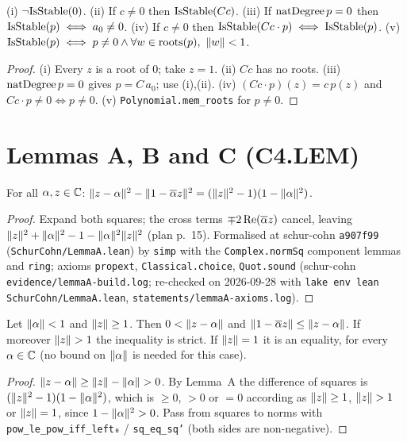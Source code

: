 \begin{lemma}\label{lem:stable-basic}
(i) $\neg\mathrm{IsStable}(0)$. (ii) If $c\ne0$ then $\mathrm{IsStable}(C c)$.
(iii) If $\mathrm{natDegree}\,p=0$ then $\mathrm{IsStable}(p)\iff a_0\ne0$.
(iv) If $c\ne0$ then $\mathrm{IsStable}(C c\cdot p)\iff\mathrm{IsStable}(p)$.
(v) $\mathrm{IsStable}(p)\iff p\ne0\wedge\forall w\in\mathrm{roots}(p),\ \lVert w \rVert<1$.
\end{lemma}
\begin{proof}
(i) Every $z$ is a root of $0$; take $z=1$. (ii) $C c$ has no roots.
(iii) $\mathrm{natDegree}\,p=0$ gives $p=C\,a_0$; use (i),(ii). (iv) $(Cc\cdot p)(z)=c\,p(z)$
and $C c\cdot p\ne0\iff p\ne0$. (v) \texttt{Polynomial.mem\_roots} for $p\ne0$.
\end{proof}

\chapter{Lemmas A, B and C (C4.LEM)}

\begin{lemma}\label{lem:A}
\leanok
For all $\alpha,z\in\mathbb{C}$:
$\lVert z-\alpha \rVert^2-\lVert 1-\overline{\alpha} z \rVert^2=(\lVert z \rVert^2-1)(1-\lVert \alpha \rVert^2)$.
\end{lemma}
\begin{proof}
\leanok
Expand both squares; the cross terms $\mp2\,\mathrm{Re}(\overline{\alpha} z)$ cancel,
leaving $\lVert z \rVert^2+\lVert \alpha \rVert^2-1-\lVert \alpha \rVert^2\lVert z \rVert^2$ (plan p.~15). Formalised at
schur-cohn \texttt{a907f99} (\texttt{SchurCohn/LemmaA.lean}) by
\texttt{simp} with the \texttt{Complex.normSq} component lemmas and \texttt{ring};
axioms \texttt{propext}, \texttt{Classical.choice}, \texttt{Quot.sound}
(schur-cohn \texttt{evidence/lemmaA-build.log}; re-checked on 2026-09-28 with
\texttt{lake env lean SchurCohn/LemmaA.lean}, \texttt{statements/lemmaA-axioms.log}).
\end{proof}

\begin{lemma}\label{lem:A-factor}
Let $\lVert \alpha \rVert<1$ and $\lVert z \rVert\ge1$. Then $0<\lVert z-\alpha \rVert$ and
$\lVert 1-\overline{\alpha} z \rVert\le\lVert z-\alpha \rVert$. If moreover $\lVert z \rVert>1$ the inequality is
strict. If $\lVert z \rVert=1$ it is an equality, for every $\alpha\in\mathbb{C}$ (no bound on
$\lVert \alpha \rVert$ is needed for this case).
\end{lemma}
\begin{proof}
$\lVert z-\alpha \rVert\ge\lVert z \rVert-\lVert \alpha \rVert>0$. By Lemma~A the difference of squares is
$(\lVert z \rVert^2-1)(1-\lVert \alpha \rVert^2)$, which is $\ge0$, $>0$ or $=0$ according as
$\lVert z \rVert\ge1$, $\lVert z \rVert>1$ or $\lVert z \rVert=1$, since $1-\lVert \alpha \rVert^2>0$. Pass from squares
to norms with \texttt{pow\_le\_pow\_iff\_left₀} / \texttt{sq\_eq\_sq'} (both
sides are non-negative).
\end{proof}

